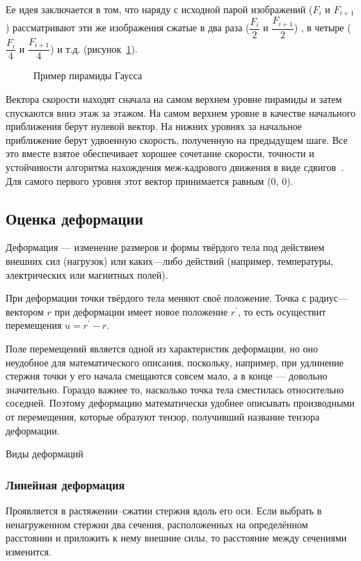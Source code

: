 Ее идея заключается в том, что наряду с исходной парой изображений ($F_i$ и $F_{i+1}$) рассматривают эти же изображения сжатые в два раза ($\dfrac{F_i}{2}$ и $\dfrac{F_{i+1}}{2}$) , в четыре ($\dfrac{F_i}{4}$ и $\dfrac{F_{i+1}}{4}$) и т.д. (рисунок~\ref{pic:pyramid}).
\begin{figure}[ht]
\caption{Пример пирамиды Гаусса}
\label{pic:pyramid}
\end{figure}

Вектора скорости находят сначала на самом верхнем уровне пирамиды и затем спускаются вниз этаж за этажом. На самом верхнем уровне в качестве начального приближения берут нулевой вектор. На нижних уровнях за начальное приближение берут удвоенную скорость, полученную на предыдущем шаге. Все это вместе взятое обеспечивает хорошее сочетание скорости, точности и устойчивости алгоритма нахождения меж-кадрового движения в виде сдвигов~\cite{Bouguet2000}. Для самого первого уровня этот вектор принимается равным (0, 0).

\subsection{Оценка деформации}
Деформация — изменение размеров и формы твёрдого тела под действием внешних сил (нагрузок) или каких—либо действий (например, температуры, электрических или магнитных полей).

При деформации точки твёрдого тела меняют своё положение. Точка с радиус—вектором $r$ при деформации имеет новое положение $r^{'}$, то есть осуществит перемещения $u = r^{'} - r$. 

Поле перемещений является одной из характеристик деформации, но оно неудобное для математического описания, поскольку, например, при удлинение стержня точки у его начала смещаются совсем мало, а в конце — довольно значительно. Гораздо важнее то, насколько точка тела сместилась относительно соседней. Поэтому деформацию математически удобнее описывать производными от перемещения, которые образуют тензор, получивший название тензора деформации.

Виды деформаций
\subsubsection{Линейная деформация}

Проявляется в растяжении--сжатии стержня вдоль его оси. Если выбрать в ненагруженном стержни два сечения, расположенных на определённом расстоянии и приложить к нему внешние силы, то расстояние между сечениями изменится.

